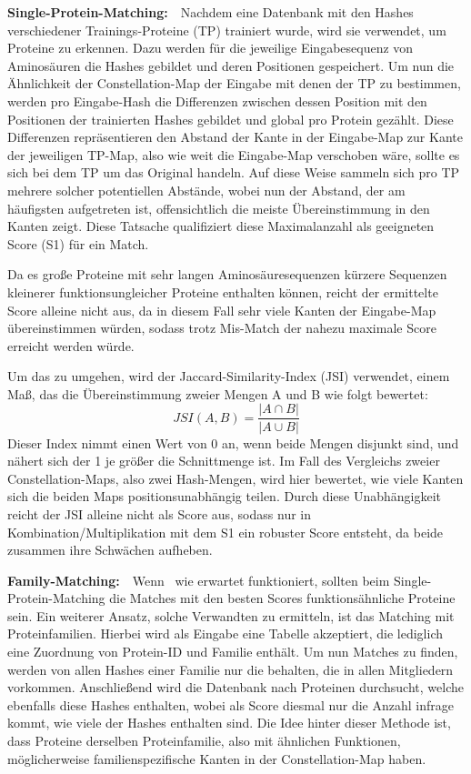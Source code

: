         \vspace{2.25mm}
        \textbf{Single-Protein-Matching:}\ \ Nachdem eine Datenbank mit den Hashes verschiedener Trainings-Proteine (TP) trainiert wurde, wird sie verwendet, um Proteine zu erkennen. Dazu werden für die jeweilige Eingabesequenz von Aminosäuren die Hashes gebildet und deren Positionen gespeichert. Um nun die Ähnlichkeit der Constellation-Map der Eingabe mit denen der TP zu bestimmen, werden pro Eingabe-Hash die Differenzen zwischen dessen Position mit den Positionen der trainierten Hashes gebildet und global pro Protein gezählt. Diese Differenzen repräsentieren den Abstand der Kante in der Eingabe-Map zur Kante der jeweiligen TP-Map, also wie weit die Eingabe-Map verschoben wäre, sollte es sich bei dem TP um das Original handeln. Auf diese Weise sammeln sich pro TP mehrere solcher potentiellen Abstände, wobei nun der Abstand, der am häufigsten aufgetreten ist, offensichtlich die meiste Übereinstimmung in den Kanten zeigt. Diese Tatsache qualifiziert diese Maximalanzahl als geeigneten Score (S1) für ein Match.

        Da es große Proteine mit sehr langen Aminosäuresequenzen kürzere Sequenzen kleinerer funktionsungleicher Proteine enthalten können, reicht der ermittelte Score alleine nicht aus, da in diesem Fall sehr viele Kanten der Eingabe-Map übereinstimmen würden, sodass trotz Mis-Match der nahezu maximale Score erreicht werden würde.

        Um das zu umgehen, wird der Jaccard-Similarity-Index (JSI) verwendet, einem Maß, das die Übereinstimmung zweier Mengen A und B wie folgt bewertet:
        $$JSI(A, B)=\frac{|A \cap B|}{|A \cup B|}$$
        Dieser Index nimmt einen Wert von 0 an, wenn beide Mengen disjunkt sind, und nähert sich der 1 je größer die Schnittmenge ist. Im Fall des Vergleichs zweier Constellation-Maps, also zwei Hash-Mengen, wird hier bewertet, wie viele Kanten sich die beiden Maps positionsunabhängig teilen. Durch diese Unabhängigkeit reicht der JSI alleine nicht als Score aus, sodass nur in Kombination/Multiplikation mit dem S1 ein robuster Score entsteht, da beide zusammen ihre Schwächen aufheben.

        \vspace{2.25mm}
        \textbf{Family-Matching:}\ \ Wenn \protfin\ wie erwartet funktioniert, sollten beim Single-Protein-Matching die Matches mit den besten Scores funktionsähnliche Proteine sein. Ein weiterer Ansatz, solche Verwandten zu ermitteln, ist das Matching mit Proteinfamilien. Hierbei wird als Eingabe eine Tabelle akzeptiert, die lediglich eine Zuordnung von Protein-ID und Familie enthält. Um nun Matches zu finden, werden von allen Hashes einer Familie nur die behalten, die in allen Mitgliedern vorkommen. Anschließend wird die Datenbank nach Proteinen durchsucht, welche ebenfalls diese Hashes enthalten, wobei als Score diesmal nur die Anzahl infrage kommt, wie viele der Hashes enthalten sind. Die Idee hinter dieser Methode ist, dass Proteine derselben Proteinfamilie, also mit ähnlichen Funktionen, möglicherweise familienspezifische Kanten in der Constellation-Map haben.
